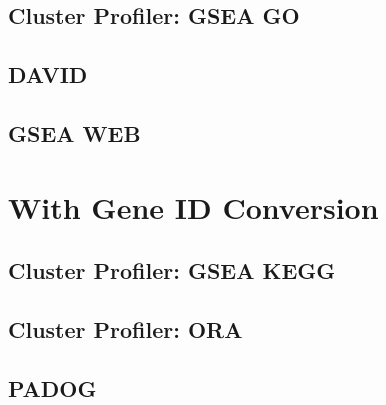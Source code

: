 \documentclass[
]{book}
\begin{document}
\hypertarget{cluster-profiler-gsea-go}{%
\chapter{Cluster Profiler: GSEA GO}\label{cluster-profiler-gsea-go}}

\hypertarget{david}{%
\chapter{DAVID}\label{david}}

\hypertarget{gsea-web}{%
\chapter{GSEA WEB}\label{gsea-web}}

\hypertarget{part-with-gene-id-conversion}{%
\part{With Gene ID Conversion}\label{part-with-gene-id-conversion}}

\hypertarget{cluster-profiler-gsea-kegg}{%
\chapter{Cluster Profiler: GSEA KEGG}\label{cluster-profiler-gsea-kegg}}

\hypertarget{cluster-profiler-ora}{%
\chapter{Cluster Profiler: ORA}\label{cluster-profiler-ora}}

\hypertarget{padog-1}{%
\chapter{PADOG}\label{padog-1}}

  
\end{document}
